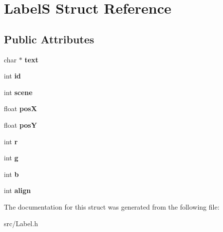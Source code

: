 \hypertarget{struct_label_s}{}\section{LabelS Struct Reference}
\label{struct_label_s}
\subsection*{Public Attributes}
\begin{DoxyCompactItemize}
\item 
\mbox{\label{struct_label_s_a6065a333c62b5a09d13324f4c876d18c}} 
char $\ast$ {\bfseries text}
\item 
\mbox{\label{struct_label_s_a14bef17a433991b2fa46300033771f5e}} 
int {\bfseries id}
\item 
\mbox{\label{struct_label_s_acf66945613bec08104da45a8f82914b3}} 
int {\bfseries scene}
\item 
\mbox{\label{struct_label_s_abd374e9a8cae5f46bd85c17606dbbcc4}} 
float {\bfseries posX}
\item 
\mbox{\label{struct_label_s_aecee8df1e219856073e5616ed2eed4aa}} 
float {\bfseries posY}
\item 
\mbox{\label{struct_label_s_a3ec33a64903b7195fa8c2b841e3b61ab}} 
int {\bfseries r}
\item 
\mbox{\label{struct_label_s_aa937d6bf5233c68610a5dab7568ec567}} 
int {\bfseries g}
\item 
\mbox{\label{struct_label_s_a48147387bcc95eb2ac7e2077b5f5cb2d}} 
int {\bfseries b}
\item 
\mbox{\label{struct_label_s_a23670dd511cf9261523c08a472e6c448}} 
int {\bfseries align}
\end{DoxyCompactItemize}


The documentation for this struct was generated from the following file\+:\begin{DoxyCompactItemize}
\item 
src/Label.\+h\end{DoxyCompactItemize}
